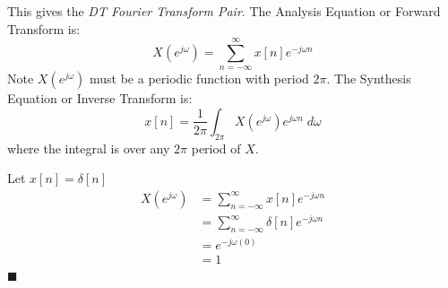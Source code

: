 This gives the \emph{DT Fourier Transform Pair}. The Analysis Equation or Forward Transform is:
\[
X\left(e^{j\omega}\right) = \sum\limits_{n = -\infty}^{\infty} x[n] e^{-j\omega n}
\]
Note $X\left(e^{j\omega}\right)$ must be a periodic function with period $2\pi$. The Synthesis Equation or Inverse Transform is:
\[
x[n] = \frac{1}{2\pi} \int_{2\pi} X\left(e^{j\omega}\right) e^{j\omega n} \; d\omega
\]
where the integral is over any $2\pi$ period of $X$.

\begin{example}
  Let $x[n] = \delta[n]$
  \begin{align*}
    X\left(e^{j\omega}\right) &= \sum\limits_{n = -\infty}^{\infty} x[n] e^{-j\omega n}\\
    &= \sum\limits_{n = -\infty}^{\infty} \delta[n] e^{-j\omega n}\\
    &= e^{-j\omega (0)}\\
    &= 1
  \end{align*}
  $\blacksquare$
\end{example}

